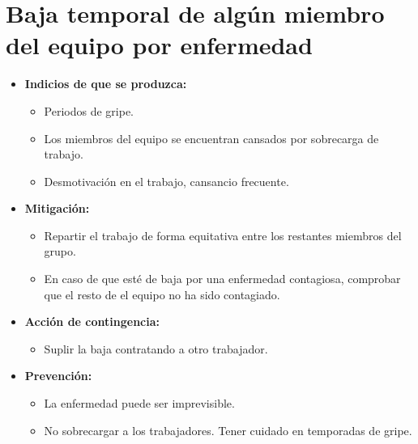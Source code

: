 \documentclass[spanish,a4paper,11pt, twoside]{report}	%
\begin{document}
	\section{Baja temporal de algún miembro del equipo por enfermedad}
		\begin{itemize}
			\item \textbf {Indicios de que se produzca: }
				\begin{itemize}
				  \item  Periodos de gripe.
				  \item  Los miembros del equipo se encuentran cansados por sobrecarga de trabajo.
				  \item  Desmotivación en el trabajo, cansancio frecuente.
				\end{itemize} 
			\item \textbf {Mitigación: }
				\begin{itemize}
					\item Repartir el trabajo de forma equitativa entre los restantes miembros del grupo.
					\item En caso de que esté de baja por una enfermedad contagiosa, comprobar que el resto de el equipo no ha sido contagiado.
				\end{itemize} 
			\item \textbf {Acción de contingencia: }
				\begin{itemize}
					\item Suplir la baja contratando a otro trabajador.
				\end{itemize}
			\item \textbf {Prevención: }
				\begin{itemize}
				  \item La enfermedad puede ser imprevisible. 
				  \item No sobrecargar a los trabajadores. Tener cuidado en temporadas de gripe. 
				\end{itemize} 
			\end{itemize}
		
\end{document}
